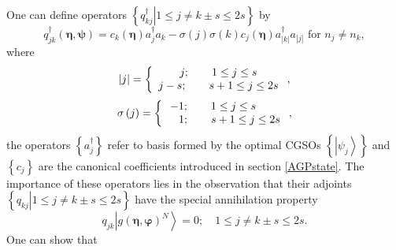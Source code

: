 \documentclass[aps,preprint]{revtex4}%
\begin{document}
One can define operators $\left\{  \left.  q_{kj}^{\dagger}\right\vert 1\leq
j\neq k\pm s\leq2s\right\}  $ by
\begin{equation}
q_{jk}^{\dagger}\left(  \bm{\eta,\psi}\right)  =c_{k}\left(
\bm{\eta }\right)  a_{j}^{\dagger}a_{k}-\sigma\left(  j\right)  \sigma\left(
k\right)  c_{j}\left(  \bm{\eta}\right)  a_{\left\vert k\right\vert }%
^{\dagger}a_{\left\vert j\right\vert }\text{ for }n_{j}\neq n_{k},
\end{equation}
where%
\begin{equation}
\left\vert j\right\vert =\left\{
\begin{array}
[c]{c}%
j;\qquad1\leq j\leq s\\
j-s;\qquad s+1\leq j\leq2s
\end{array}
\right.  ,
\end{equation}%
\begin{equation}
\sigma\left(  j\right)  =\left\{
\begin{array}
[c]{c}%
-1;\qquad1\leq j\leq s\quad\quad\\
\quad1;\qquad s+1\leq j\leq2s
\end{array}
\right.  ,
\end{equation}
the operators $\left\{  a_{j}^{\dagger}\right\}  $ refer to basis formed by
the optimal CGSOs $\left\{  \left\vert \psi_{j}\right\rangle \right\}  $ and
$\left\{  c_{j}\right\}  $ are the canonical coefficients introduced in
section \ref{AGPstate}. The importance of these operators lies in the
observation that their adjoints $\left\{  \left.  q_{kj}\right\vert 1\leq
j\neq k\pm s\leq2s\right\}  $ have the special annihilation property%
\begin{equation}
q_{jk}\left\vert g\left(  \bm{\eta},\bm{\varphi}\right)  ^{N}\right\rangle
=0;\quad1\leq j\neq k\pm s\leq2s.
\end{equation}
One can show \cite{Goscinski82a} that
\end{document}
